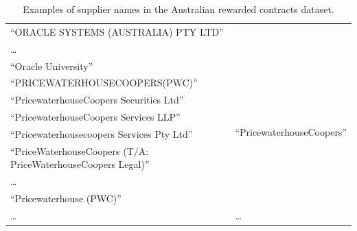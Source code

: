 \documentclass{llncs}
\begin{document}
\begin{table}[!htb]
\begin{center}
\begin{tabular}{|p{7cm}|p{7cm}|}
  ``ORACLE SYSTEMS (AUSTRALIA) PTY LTD'' & \\
  \ldots  & \\
  ``Oracle University''  & \\ \hline
  ``PRICEWATERHOUSECOOPERS(PWC)''  & \multirow{6}{*}{``PricewaterhouseCoopers''} \\
  ``PricewaterhouseCoopers Securities Ltd''& \multirow{6}{*}{\scriptsize\url{http://dbpedia.org/resource/PricewaterhouseCoopers}} \\
  ``PricewaterhouseCoopers Services LLP'' & \\
  ``Pricewaterhousecoopers Services Pty Ltd'' & \\
  ``PriceWaterhouseCoopers (T/A: PriceWaterhouseCoopers Legal)'' & \\
  \ldots  & \\
  ``Pricewaterhouse (PWC)'' & \\ \hline
  \ldots & \ldots \\
  \hline
  \end{tabular}
  \caption{Examples of supplier names in the Australian rewarded contracts dataset.}
  \label{tabla:aus-suppliers}
  \end{center}
\end{table} 
\end{document}
